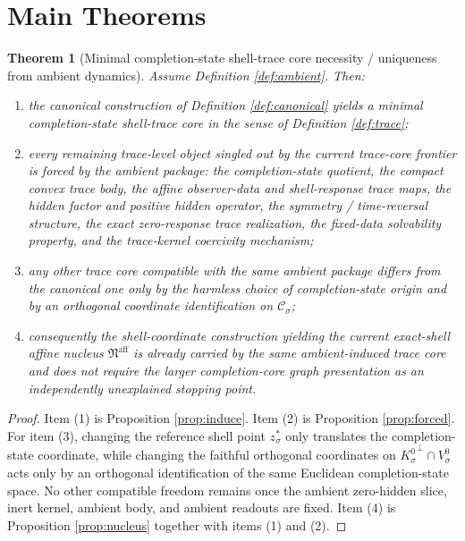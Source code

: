 \documentclass[11pt]{article}
\newcommand{\AffineNucleus}{\mathfrak N^{\mathrm{aff}}}
\newcommand{\ZeroHiddenVec}[1]{V_{#1}^{0}}
\newcommand{\Kernel}[1]{K_{#1}^{0}}
\newcommand{\ReferencePoint}[1]{z_{#1}^{\ast}}
\newcommand{\CoreState}[1]{\mathcal C_{#1}}
\newtheorem{theorem}{Theorem}
\begin{document}
\section{Main Theorems}

\begin{theorem}[Minimal completion-state shell-trace core necessity / uniqueness from ambient dynamics]
\label{thm:necessity}
Assume Definition \ref{def:ambient}. Then:
\begin{enumerate}
    \item the canonical construction of Definition \ref{def:canonical} yields a minimal completion-state shell-trace core in the sense of Definition \ref{def:trace};
    \item every remaining trace-level object singled out by the current trace-core frontier is forced by the ambient package: the completion-state quotient, the compact convex trace body, the affine observer-data and shell-response trace maps, the hidden factor and positive hidden operator, the symmetry / time-reversal structure, the exact zero-response trace realization, the fixed-data solvability property, and the trace-kernel coercivity mechanism;
    \item any other trace core compatible with the same ambient package differs from the canonical one only by the harmless choice of completion-state origin and by an orthogonal coordinate identification on \(\CoreState{\sigma}\);
    \item consequently the shell-coordinate construction yielding the current exact-shell affine nucleus \(\AffineNucleus\) is already carried by the same ambient-induced trace core and does not require the larger completion-core graph presentation as an independently unexplained stopping point.
\end{enumerate}
\end{theorem}

\begin{proof}
Item (1) is Proposition \ref{prop:induce}. Item (2) is Proposition \ref{prop:forced}. For item (3), changing the reference shell point \(\ReferencePoint{\sigma}\) only translates the completion-state coordinate, while changing the faithful orthogonal coordinates on \({\Kernel{\sigma}}^{\perp}\cap\ZeroHiddenVec{\sigma}\) acts only by an orthogonal identification of the same Euclidean completion-state space. No other compatible freedom remains once the ambient zero-hidden slice, inert kernel, ambient body, and ambient readouts are fixed. Item (4) is Proposition \ref{prop:nucleus} together with items (1) and (2).
\end{proof}
\end{document}
